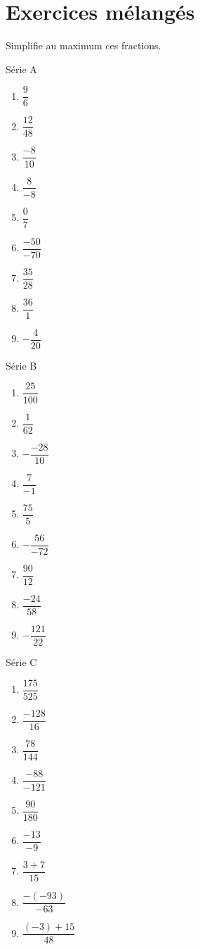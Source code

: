 \documentclass[../math2.tex]{subfiles}
\begin{document}
\newpage
\section{Exercices mélangés}

\begin{exercise}
  Simplifie au maximum ces fractions.

  Série A
  \begin{enumerate}[cols=3]
    \item $\dfrac{9}{6}$
    \item $\dfrac{12}{48}$
    \item $\dfrac{-8}{10}$
    \item $\dfrac{8}{-8}$
    \item $\dfrac{0}{7}$
    \item $\dfrac{-50}{-70}$
    \item $\dfrac{35}{28}$
    \item $\dfrac{36}{1}$
    \item $-\dfrac{4}{20}$
  \end{enumerate}

  Série B
  \begin{enumerate}[cols=3]
    \item $\dfrac{25}{100}$
    \item $\dfrac{1}{62}$
    \item $-\dfrac{-28}{10}$
    \item $\dfrac{7}{-1}$
    \item $\dfrac{75}{5}$
    \item $-\dfrac{56}{-72}$
    \item $\dfrac{90}{12}$
    \item $\dfrac{-24}{58}$
    \item $-\dfrac{121}{22}$
  \end{enumerate}

  Série C
  \begin{enumerate}[cols=3]
    \item $\dfrac{175}{525}$
    \item $\dfrac{- 128}{16}$
    \item $\dfrac{78}{144}$
    \item $\dfrac{- 88}{- 121}$
    \item $\dfrac{90}{180}$
    \item $\dfrac{- 13}{- 9}$
    \item $\dfrac{3 + 7}{15}$
    \item $\dfrac{- ( - 93)}{- 63}$
    \item $\dfrac{( - 3) + 15}{48}$
  \end{enumerate}
\end{exercise}
\end{document}
